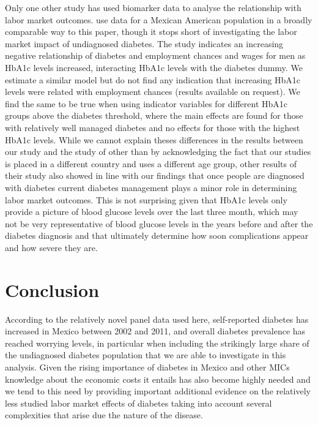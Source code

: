 \documentclass[12pt,english,british]{article}
\begin{document}
Only one other study has used biomarker data to analyse the relationship with labor market outcomes. \citet{BrownIII2011} use data for a Mexican American
population in a broadly comparable way to this paper, though it stops short of investigating
the labor market impact of undiagnosed diabetes. The study indicates
an increasing negative relationship of diabetes and employment
chances and wages for men as \ac{HbA1c} levels increased, interacting \ac{HbA1c} levels
with the diabetes dummy. We estimate a similar model but
do not find any indication that increasing \ac{HbA1c} levels were
related with employment chances (results available on request). We
find the same to be true when using indicator variables for different
\ac{HbA1c} groups above the diabetes threshold, where the main effects
are found for those with relatively well managed diabetes and no
effects for those with the highest \ac{HbA1c} levels. While we cannot explain theses differences in the results between our study and the study of \citet{BrownIII2011} other than by acknowledging the fact that our studies is placed in a different country and uses a different age group, other results of their study also showed in line with our findings that once people are diagnosed with diabetes current diabetes management plays a minor role in determining labor market outcomes. This is not surprising given that \ac{HbA1c} levels only provide a picture of blood glucose levels over the last three month, which may not be very representative of blood glucose levels in the years before and after the diabetes diagnosis and that ultimately determine how soon complications appear and how severe they are.



\section{\label{sec:Conclusion}Conclusion}

According to the relatively novel panel data used here, self-reported diabetes has increased in Mexico between 2002 and 2011, and overall
diabetes prevalence has reached worrying
levels, in particular when including the strikingly large share of the undiagnosed diabetes population that we are able to investigate in this analysis. Given the rising importance of diabetes in Mexico and other \ac{MICs} knowledge about the economic costs it entails has also become highly needed and we tend to this need by providing important additional evidence on the relatively less studied labor market effects of diabetes taking into account several complexities that arise due the nature of the disease.
\end{document}

